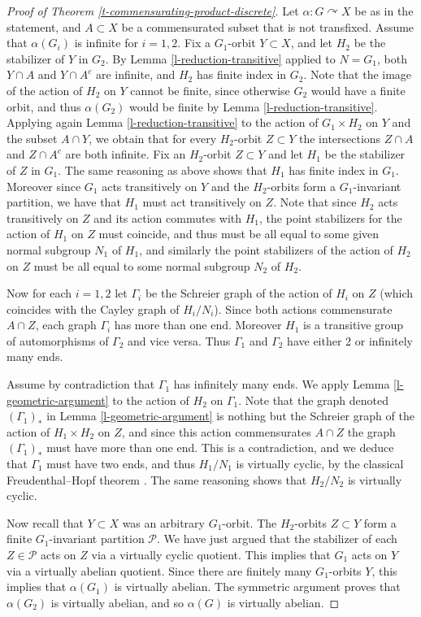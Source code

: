 \documentclass[11pt]{amsart}
\newcommand{\acts}{\ensuremath{\curvearrowright}}%
\theoremstyle{definition}
\theoremstyle{plain}
\newtheorem{main thm}{Theorem}
\theoremstyle{remark}
\theoremstyle{plain}
\begin{document}
\begin{proof}[Proof of Theorem \ref{t-commensurating-product-discrete}]
Let $\alpha\colon G\acts X$ be as in the statement, and $A\subset X$ be a commensurated subset that is not transfixed. Assume that $\alpha(G_i)$ is infinite for $i=1, 2$. Fix a  $G_1$-orbit  $Y\subset X$, and let $H_2$ be the stabilizer of $Y$ in $G_2$. By Lemma \ref{l-reduction-transitive} applied to $N=G_1$, both $Y\cap A$ and $Y\cap A^c$ are infinite, and $H_2$ has finite index in $G_2$. Note that the image of the action of $H_2$ on $Y$ cannot be finite, since otherwise $G_2$ would have a finite orbit, and thus $\alpha(G_2)$ would be finite by Lemma \ref{l-reduction-transitive}. Applying again Lemma \ref{l-reduction-transitive}  to the action of $G_1\times H_2$ on $Y$ and the subset $A\cap Y$, we obtain that for every $H_2$-orbit $Z\subset Y$ the intersections $Z\cap A$ and $Z\cap A^c$ are both infinite. Fix an $H_2$-orbit $Z\subset Y$ and let $H_1$ be the stabilizer of $Z$ in $G_1$. The same reasoning as above shows that $H_1$ has finite index in $G_1$. Moreover since $G_1$ acts transitively on $Y$ and the $H_2$-orbits form a $G_1$-invariant partition, we have that $H_1$ must act transitively on $Z$. Note that since $H_2$ acts transitively on $Z$ and its action commutes with $H_1$, the point stabilizers for the action of $H_1$ on $Z$ must coincide, and thus must be all equal to some given normal subgroup $N_1$ of $H_1$, and similarly the point stabilizers of the action of $H_2$ on $Z$ must be all equal to some normal subgroup $N_2$ of $H_2$.

Now for each $i=1, 2$ let $\Gamma_i$ be the Schreier graph of the action of $H_i$ on $Z$ (which coincides with the Cayley graph of $H_i/N_i$). Since both actions commensurate $A\cap Z$, each graph $\Gamma_i$ has more than one end. Moreover $H_1$ is a transitive group of automorphisms of $\Gamma_2$ and vice versa. Thus $\Gamma_1$ and $\Gamma_2$  have either 2 or infinitely many ends. 

Assume by contradiction that $\Gamma_1$ has infinitely many ends. We apply Lemma \ref{l-geometric-argument} to the action of $H_2$ on $\Gamma_1$. Note that the graph denoted $(\Gamma_1)_*$ in Lemma \ref{l-geometric-argument} is nothing but the Schreier graph of the action of $H_1\times H_2$ on $Z$, and since this action commensurates $A\cap Z$ the graph $(\Gamma_1)_*$ must have more than one end. This is a contradiction, and we deduce that $\Gamma_1$ must have two ends, and thus $H_1/N_1$ is virtually cyclic, by the classical Freudenthal--Hopf theorem \cite{Freudenthal, Hopf}. The same reasoning shows that $H_2/N_2$ is virtually cyclic. 

Now recall that $Y\subset X$ was an arbitrary $G_1$-orbit. The $H_2$-orbits $Z\subset Y$ form a finite $G_1$-invariant partition $\mathcal{P}$. We have just argued that the stabilizer of each $Z\in \mathcal{P}$ acts on $Z$ via a virtually cyclic quotient. This implies that $G_1$ acts on $Y$ via a virtually abelian quotient. Since there are finitely many $G_1$-orbits $Y$, this implies that $\alpha(G_1)$ is virtually abelian. The symmetric argument proves that $\alpha(G_2)$ is virtually abelian, and so $\alpha(G)$ is virtually abelian. \qedhere\end{proof}
\end{document}

